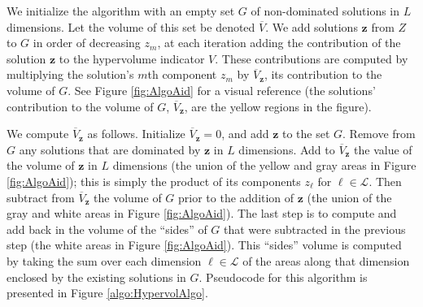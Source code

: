 We initialize the algorithm with an empty set $G$ of non-dominated solutions in $L$ dimensions. Let the volume of this set be denoted $\overbar{V}$. We add solutions $\mathbf{z}$ from $Z$ to $G$ in order of decreasing $z_m$, at each iteration adding the contribution of the solution $\mathbf{z}$ to the hypervolume indicator $V$. These contributions are computed by multiplying the solution's $m$th component $z_m$ by $\overbar{V}_\mathbf{z}$, its contribution to the volume of $G$. See Figure \ref{fig:AlgoAid} for a visual reference (the solutions' contribution to the volume of $G$, $\overbar{V}_\mathbf{z}$, are the yellow regions in the figure).

We compute $\overbar{V}_\mathbf{z}$ as follows. Initialize $\overbar{V}_\mathbf{z} = 0$, and add $\mathbf{z}$ to the set $G$. Remove from $G$ any solutions that are dominated by $\mathbf{z}$ in $L$ dimensions. Add to $\overbar{V}_\mathbf{z}$ the value of the volume of $\mathbf{z}$ in $L$ dimensions (the union of the yellow and gray areas in Figure \ref{fig:AlgoAid}); this is simply the product of its components $z_\ell$ for $\ell \in \mathcal{L}$. Then subtract from $\overbar{V}_\mathbf{z}$ the volume of $G$ prior to the addition of $\mathbf{z}$ (the union of the gray and white areas in Figure \ref{fig:AlgoAid}). The last step is to compute and add back in the volume of the ``sides'' of $G$ that were subtracted in the previous step (the white areas in Figure \ref{fig:AlgoAid}). This ``sides'' volume is computed by taking the sum over each dimension $\ell \in \mathcal{L}$ of the areas along that dimension enclosed by the existing solutions in $G$. Pseudocode for this algorithm is presented in Figure \ref{algo:HypervolAlgo}.

